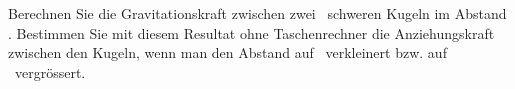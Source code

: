 Berechnen Sie die Gravitationskraft zwischen zwei \mKuO\ schweren Kugeln im Abstand \rAO. Bestimmen Sie mit diesem Resultat ohne Taschenrechner die Anziehungskraft zwischen den Kugeln, wenn man den Abstand auf \rBO\ verkleinert bzw. auf \rCO\ vergrössert.
